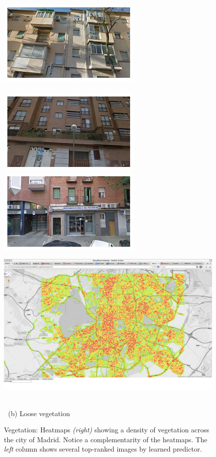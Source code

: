 \begin{figure}
\begin{minipage}{\linewidth}
\begin{minipage}{0.3\linewidth}
      \includegraphics[width=0.49\linewidth]{imgs/vege/mosaicsT1/mosaic0080.jpg}
      \\ \vspace{-3mm} \\
      \includegraphics[width=0.49\linewidth]{imgs/vege/mosaicsT1/mosaic0042.jpg}
      \includegraphics[width=0.49\linewidth]{imgs/vege/mosaicsT1/mosaic0048.jpg}
    \end{minipage}
    \begin{minipage}{0.7\linewidth}
      \includegraphics[trim= 350 150 250 150, clip=true, width=\linewidth]{imgs/vege/mapT1.jpg}
    \end{minipage}
  \end{minipage}
  \\
  $\;$\hspace{30mm} (b) Loose vegetation
  \\
  \caption{
    Vegetation: Heatmaps \emph{(right)} showing a density of vegetation across the city of Madrid. Notice a complementarity of the heatmaps. The \emph{left} column shows several top-ranked images by learned predictor.
  }
  \label{fig:vege}
\end{figure}